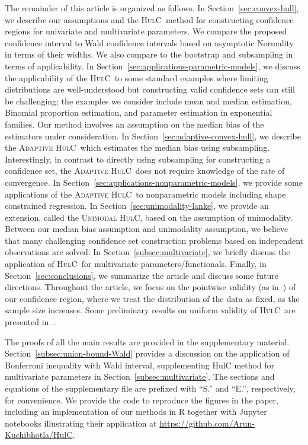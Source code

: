 \documentclass{article}
\newcommand{\hulc}{\textsc{HulC}~}
\newcommand{\ahulc}{\textsc{Adaptive HulC}~}
\newcommand{\uhulcnospace}{\textsc{Unimodal HulC}}
\numberwithin{myalgctr}{section}
\begin{document}
The remainder of this article is organized as follows. In Section~\ref{sec:convex-hull}, we describe our assumptions and the \hulc method for constructing confidence regions for univariate and multivariate parameters. We compare the proposed confidence interval to Wald confidence intervals based on asymptotic Normality in terms of their widths. We also compare to the bootstrap and subsampling in terms of applicability. In Section~\ref{sec:applications-parametric-models}, we discuss the applicability of the \hulc to some standard examples where limiting distributions are well-understood but constructing valid confidence sets can still be challenging; the examples we consider include mean and median estimation, Binomial proportion estimation, and parameter estimation in exponential families. Our method involves an assumption on the median bias of the estimators under consideration. In Section~\ref{sec:adaptive-convex-hull}, we describe the \ahulc which estimates the median bias using subsampling. Interestingly, in contrast to directly using subsampling for constructing a confidence set, the \ahulc does not require 
knowledge of the rate of convergence. In Section~\ref{sec:applications-nonparametric-models}, we provide some applications of the \ahulc to nonparametric models including shape constrained regression. In Section~\ref{sec:unimodality-lanke}, we provide an extension, called the \uhulcnospace, based on the assumption of unimodality. Between our {\color{black}median bias} assumption and unimodality assumption, we believe that many challenging confidence set construction problems based on independent observations are solved. {\color{black}In Section~\ref{subsec:multivariate}, we briefly discuss the application of \hulc for multivariate parameters/functionals.} Finally, in Section~\ref{sec:conclusions}, we summarize the article and discuss some future directions. 
Throughout the article, we focus on the pointwise validity (as in~\cite{politis1994large}) of our confidence region{\color{black}, where we treat the distribution of the data as fixed, as the sample size increases.
Some preliminary results on uniform validity of \hulc are presented in~\cite{kuchibhotlamedian}. 
}

The proofs of all the main results are provided in the supplementary material. {\color{black}Section~\ref{subsec:union-bound-Wald} provides a discussion on the application of Bonferroni inequality with Wald interval, supplementing HulC method for multivariate parameters in Section~\ref{subsec:multivariate}.} The sections and equations of the supplementary file are prefixed with ``S.'' and ``E.'', respectively, for convenience. We provide the code to reproduce the figures in the paper, including an implementation of our methods in R together with Jupyter notebooks illustrating their application at \url{https://github.com/Arun-Kuchibhotla/HulC}.
\end{document}

